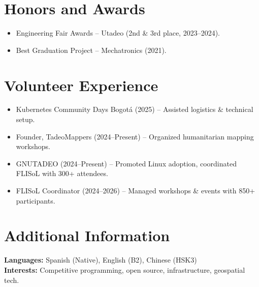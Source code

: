 \documentclass[a4paper,11pt]{article}
\newcommand{\resumeSubHeadingListStart}{\begin{itemize}[leftmargin=*,labelsep=1mm]}
\newcommand{\resumeSubHeadingListEnd}{\end{itemize}\vspace{2mm}}
\begin{document}
\section{\textbf{Honors and Awards}}
\resumeSubHeadingListStart
\item Engineering Fair Awards – Utadeo (2nd \& 3rd place, 2023–2024).
\item Best Graduation Project – Mechatronics (2021).
\resumeSubHeadingListEnd



\section{\textbf{Volunteer Experience}}
\resumeSubHeadingListStart
\item Kubernetes Community Days Bogotá (2025) – Assisted logistics \& technical setup.
\item Founder, TadeoMappers (2024–Present) – Organized humanitarian mapping workshops.
\item GNUTADEO (2024–Present) – Promoted Linux adoption, coordinated FLISoL with 300+ attendees.
\item FLISoL Coordinator (2024–2026) – Managed workshops \& events with 850+ participants.
\resumeSubHeadingListEnd


\section{\textbf{Additional Information}}
\small{
\textbf{Languages:} Spanish (Native), English (B2), Chinese (HSK3) \\
\textbf{Interests:} Competitive programming, open source, infrastructure, geospatial tech.
}
\end{document}
